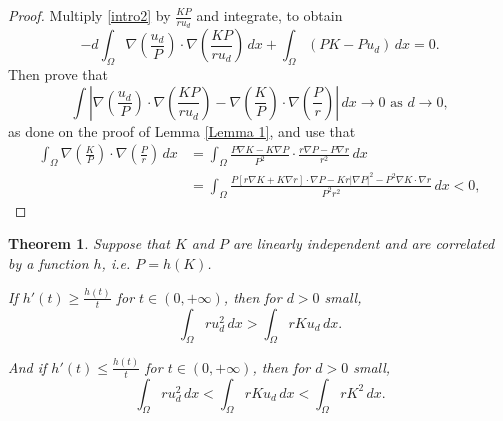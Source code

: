 \documentclass[11pt]{article}
\newcommand{\parentheses}[1]{\left(#1\right)}
\newcommand{\module}[1]{\left|#1\right|}
\newtheorem{theorem}[statement]{Theorem}
\theoremstyle{definition}
\theoremstyle{remark}
\begin{document}
\begin{proof}
    Multiply \eqref{intro2} by $\frac{KP}{r u_d}$ and integrate, to obtain
        \begin{equation*}
            -d\int_\Omega\nabla\parentheses{\frac{u_d}{P}}\cdot\nabla\parentheses{\frac{KP}{r u_d}}\,dx+\int_\Omega(PK-Pu_d)\,dx=0.
        \end{equation*}
        Then prove that
        \begin{equation*}
            \int\module{\nabla\parentheses{\frac{u_d}{P}}\cdot\nabla\parentheses{\frac{KP}{r u_d}}-\nabla\parentheses{\frac{K}{P}}\cdot\nabla\parentheses{\frac{P}{r}}}\,dx\to0 \textrm{ as } d\to0, 
        \end{equation*}
        as done on the proof of Lemma \eqref{Lemma 1}, and use that
        \begin{align*}
            \int_\Omega\nabla\parentheses{\frac{K}{P}}\cdot\nabla\parentheses{\frac{P}{r}}\,dx& =\int_\Omega\frac{P\nabla K-K\nabla P}{P^2}\cdot\frac{r\nabla P-P\nabla r}{r^2}\,dx
            \\ & =\int_\Omega\frac{P[r\nabla K+K\nabla r]\cdot\nabla P-Kr|\nabla P|^2-P^2\nabla K\cdot\nabla r}{P^2r^2}\,dx<0,
        \end{align*}
\end{proof}


\begin{theorem}\label{thm: weighted ineq 2}
    Suppose that $K$ and $P$ are linearly independent and are correlated by a function $h$, i.e. $P=h(K)$. 
    
    If $h'(t)\geq\frac{h(t)}{t}$ for $t\in(0,+\infty)$, then for $d>0$ small,
    \begin{equation*}
        \int_\Omega ru_d^2\,dx>\int_\Omega rKu_d\,dx.
    \end{equation*}

    And if $h'(t)\leq\frac{h(t)}{t}$ for $t\in(0,+\infty)$, then for $d>0$ small,
    \begin{equation*}
        \int_\Omega ru_d^2\,dx<\int_\Omega rKu_d\,dx %
<\int_\Omega rK^2\,dx.
    \end{equation*}
   
\end{theorem}
\end{document}
